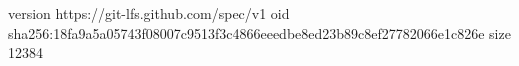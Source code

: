 version https://git-lfs.github.com/spec/v1
oid sha256:18fa9a5a05743f08007c9513f3c4866eeedbe8ed23b89c8ef27782066e1c826e
size 12384
